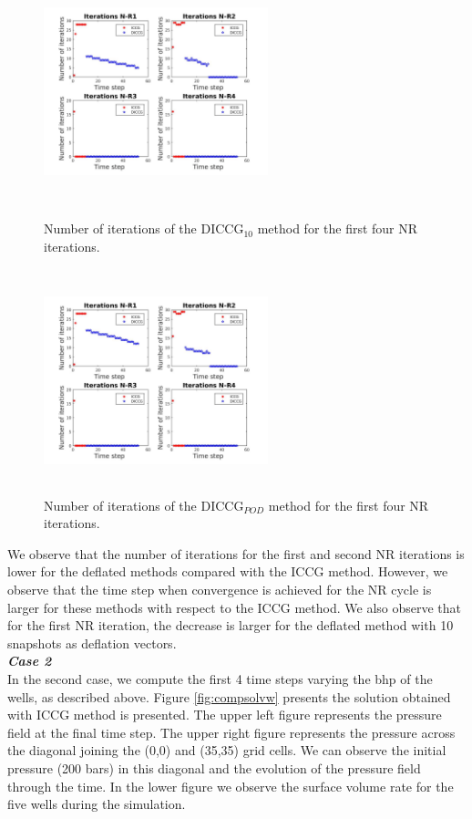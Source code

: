 \documentclass[12pt]{article}
\begin{document}
\begin{figure}[!h]
\centering
\begin{minipage}{.4\textwidth}
 \centering
\includegraphics[width=6.5cm,height=6.5cm,keepaspectratio]
{iterations_4NR_D10.jpg}
\caption{Number of iterations of the DICCG$_{10}$ method for the first four NR iterations.}
\label{fig:NR_D10}
\end{minipage}%
\hspace{15mm}
\begin{minipage}{.4\textwidth}
 \centering
\includegraphics[width=6.5cm,height=6.5cm,keepaspectratio]
{iterations_4NR_POD5.jpg}
\caption{Number of iterations of the DICCG$_{POD}$ method for the first four NR iterations.}
\label{fig:NR_POD5}
\end{minipage}
\end{figure}
We observe that the number of iterations for the first and second NR iterations is lower for the deflated methods compared with the ICCG method. However, we observe that the time step when convergence is achieved for the NR cycle is larger for these methods with respect to the ICCG method. We also observe that for the first NR iteration, the decrease is larger for the deflated method with 10 snapshots as deflation vectors.\\
\emph{\textbf{Case 2}}\\
In the second case, we compute the first 4 time steps varying the bhp of the wells, as described above. Figure \ref{fig:compsolvw} presents the solution obtained with ICCG method is presented. The upper left figure represents the pressure field at the final time step. The upper right figure represents the pressure across the diagonal joining the (0,0) and (35,35) grid cells. We can observe the initial pressure (200 bars) in this diagonal and the evolution of the pressure field through the time. In the lower figure we observe the surface volume rate for the five wells during the simulation.
\end{document}
